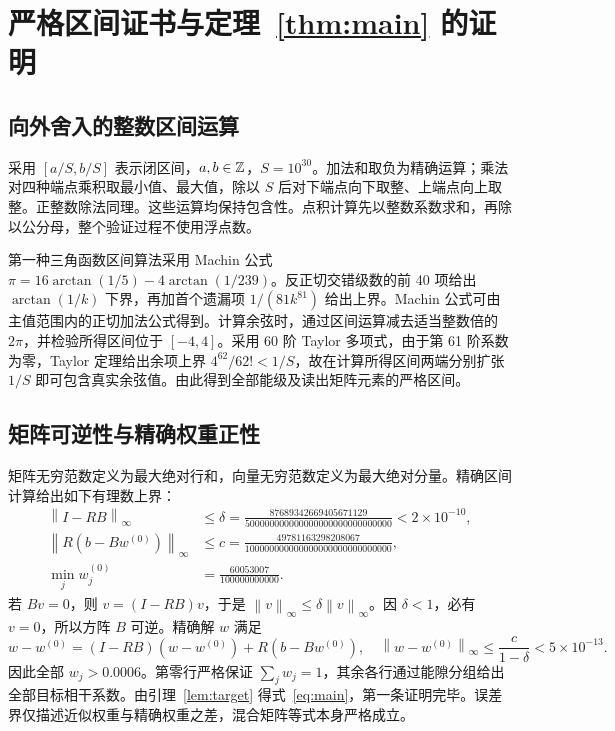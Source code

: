 \documentclass[11pt,a4paper]{article}
\newcommand{\norm}[1]{\left\lVert #1\right\rVert_\infty}
\begin{document}
\section{严格区间证书与定理~\ref{thm:main} 的证明}
\subsection{向外舍入的整数区间运算}
采用 $[a/S,b/S]$ 表示闭区间，$a,b\in\mathbb Z$，$S=10^{30}$。加法和取负为精确运算；乘法对四种端点乘积取最小值、最大值，除以 $S$ 后对下端点向下取整、上端点向上取整。正整数除法同理。这些运算均保持包含性。点积计算先以整数系数求和，再除以公分母，整个验证过程不使用浮点数。

第一种三角函数区间算法采用 Machin 公式 $\pi=16\arctan(1/5)-4\arctan(1/239)$。反正切交错级数的前 40 项给出 $\arctan(1/k)$ 下界，再加首个遗漏项 $1/(81k^{81})$ 给出上界。Machin 公式可由主值范围内的正切加法公式得到。计算余弦时，通过区间运算减去适当整数倍的 $2\pi$，并检验所得区间位于 $[-4,4]$。采用 60 阶 Taylor 多项式，由于第 61 阶系数为零，Taylor 定理给出余项上界 $4^{62}/62!<1/S$，故在计算所得区间两端分别扩张 $1/S$ 即可包含真实余弦值。由此得到全部能级及读出矩阵元素的严格区间。
\subsection{矩阵可逆性与精确权重正性}
矩阵无穷范数定义为最大绝对行和，向量无穷范数定义为最大绝对分量。精确区间计算给出如下有理数上界：
\begin{align}
\norm{I-RB}&\le\delta=\frac{87689342669405671129}{500000000000000000000000000000}<2\times10^{-10},\label{eq:defect}\\
\norm{R(b-Bw^{(0)})}&\le c=\frac{49781163298208067}{100000000000000000000000000000},\\
\min_j w_j^{(0)}&=\frac{60053007}{100000000000}.
\end{align}
若 $Bv=0$，则 $v=(I-RB)v$，于是 $\norm v\le\delta\norm v$。因 $\delta<1$，必有 $v=0$，所以方阵 $B$ 可逆。精确解 $w$ 满足
\[
w-w^{(0)}=(I-RB)(w-w^{(0)})+R(b-Bw^{(0)}),\quad
\norm{w-w^{(0)}}\le\frac{c}{1-\delta}<5\times10^{-13}.
\]
因此全部 $w_j>0.0006$。第零行严格保证 $\sum_jw_j=1$，其余各行通过能隙分组给出全部目标相干系数。由引理~\ref{lem:target} 得式~\eqref{eq:main}，第一条证明完毕。误差界仅描述近似权重与精确权重之差，混合矩阵等式本身严格成立。
\end{document}
